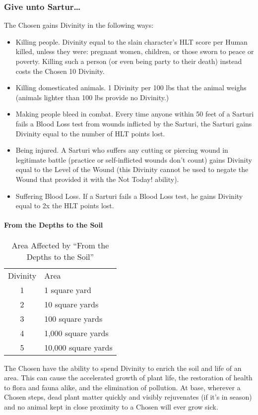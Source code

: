\documentclass[oneside,11pt,english]{book}
\begin{document}
\subsubsection{Give unto Sartur\dots} 
The Chosen gains Divinity in the following ways: 
\begin{itemize}
\item Killing people. Divinity equal to the slain character's HLT score per Human killed, 
unless they were: pregnant women, children, or those sworn to peace or poverty. Killing 
such a person (or even being party to their death) instead costs the Chosen 10 Divinity. 
\item Killing domesticated animals. 1 Divinity per 100 lbs that the animal weighs (animals 
lighter than 100 lbs provide no Divinity.) 
\item Making people bleed in combat. Every time anyone within 50 feet of a Sarturi fails a 
Blood Loss test from wounds inflicted by the Sarturi, the Sarturi gains Divinity equal to 
the number of HLT points lost. 
\item Being injured. A Sarturi who suffers any cutting or piercing wound in legitimate battle 
(practice or self-inflicted wounds don't count) gains Divinity equal to the Level of the 
Wound (this Divinity cannot be used to negate the Wound that provided it with the Not 
Today! ability). 
\item Suffering Blood Loss. If a Sarturi fails a Blood Loss test, he gains Divinity equal to 2x 
the HLT points lost. 
\end{itemize}
\paragraph{From the Depths to the Soil}
\begin{wraptable}{r}{7 cm}
	\caption{Area Affected by ``From the Depths to the Soil''}
	\label{tab:sarturflowerpower}
	\begin{tabu} spread 0pt {cX}
		Divinity&Area\\
		1&1 square yard\\
		2&10 square yards\\
		3&100 square yards\\
		4&1,000 square yards\\
		5&10,000 square yards\\
	\end{tabu}
\end{wraptable}
The Chosen have the ability to spend Divinity to enrich the soil and life of an area. This can cause 
the accelerated growth of plant life, the restoration of health to flora and fauna alike, and the 
elimination of pollution. At base, wherever a Chosen steps, dead plant matter quickly and visibly 
rejuvenates (if it's in season) and no animal kept in close proximity to a Chosen will ever grow 
sick. 
\end{document}
